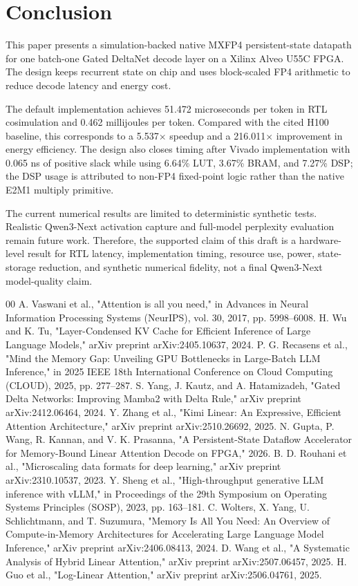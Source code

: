 \documentclass[conference]{IEEEtran}
\begin{document}
\section{Conclusion}
This paper presents a simulation-backed native MXFP4 persistent-state datapath for one batch-one Gated DeltaNet decode layer on a Xilinx Alveo U55C FPGA. The design keeps recurrent state on chip and uses block-scaled FP4 arithmetic to reduce decode latency and energy cost.

The default implementation achieves 51.472 microseconds per token in RTL cosimulation and 0.462 millijoules per token. Compared with the cited H100 baseline, this corresponds to a 5.537$\times$ speedup and a 216.011$\times$ improvement in energy efficiency. The design also closes timing after Vivado implementation with 0.065 ns of positive slack while using 6.64\% LUT, 3.67\% BRAM, and 7.27\% DSP; the DSP usage is attributed to non-FP4 fixed-point logic rather than the native E2M1 multiply primitive.

The current numerical results are limited to deterministic synthetic tests. Realistic Qwen3-Next activation capture and full-model perplexity evaluation remain future work. Therefore, the supported claim of this draft is a hardware-level result for RTL latency, implementation timing, resource use, power, state-storage reduction, and synthetic numerical fidelity, not a final Qwen3-Next model-quality claim.

\begin{thebibliography}{00}
 A. Vaswani et al., "Attention is all you need," in Advances in Neural Information Processing Systems (NeurIPS), vol. 30, 2017, pp. 5998--6008.
 H. Wu and K. Tu, "Layer-Condensed KV Cache for Efficient Inference of Large Language Models," arXiv preprint arXiv:2405.10637, 2024.
 P. G. Recasens et al., "Mind the Memory Gap: Unveiling GPU Bottlenecks in Large-Batch LLM Inference," in 2025 IEEE 18th International Conference on Cloud Computing (CLOUD), 2025, pp. 277--287.
 S. Yang, J. Kautz, and A. Hatamizadeh, "Gated Delta Networks: Improving Mamba2 with Delta Rule," arXiv preprint arXiv:2412.06464, 2024.
 Y. Zhang et al., "Kimi Linear: An Expressive, Efficient Attention Architecture," arXiv preprint arXiv:2510.26692, 2025.
 N. Gupta, P. Wang, R. Kannan, and V. K. Prasanna, "A Persistent-State Dataflow Accelerator for Memory-Bound Linear Attention Decode on FPGA," 2026.
 B. D. Rouhani et al., "Microscaling data formats for deep learning," arXiv preprint arXiv:2310.10537, 2023.
 Y. Sheng et al., "High-throughput generative LLM inference with vLLM," in Proceedings of the 29th Symposium on Operating Systems Principles (SOSP), 2023, pp. 163--181.
 C. Wolters, X. Yang, U. Schlichtmann, and T. Suzumura, "Memory Is All You Need: An Overview of Compute-in-Memory Architectures for Accelerating Large Language Model Inference," arXiv preprint arXiv:2406.08413, 2024.
 D. Wang et al., "A Systematic Analysis of Hybrid Linear Attention," arXiv preprint arXiv:2507.06457, 2025.
 H. Guo et al., "Log-Linear Attention," arXiv preprint arXiv:2506.04761, 2025.
\end{thebibliography}
\end{document}
